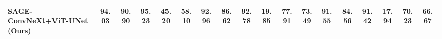 \begin{table}[t]
{\begin{tabular}{l|ccccc|cccccc|cccccc}
\midrule
\textbf{SAGE-ConvNeXt+ViT-UNet (Ours)} 
& \cellcolor{BestColor}\textcolor{BestTextColor}{94.03} & \cellcolor{BestColor}\textcolor{BestTextColor}{90.90} & \cellcolor{BestColor}\textcolor{BestTextColor}{95.23} & \cellcolor{SecondBestColor}\textcolor{SecondBestTextColor}{45.20} & \cellcolor{SecondBestColor}\textcolor{SecondBestTextColor}{58.10} 
& \cellcolor{BestColor}\textcolor{BestTextColor}{92.96} & \cellcolor{BestColor}\textcolor{BestTextColor}{86.62} & \cellcolor{BestColor}\textcolor{BestTextColor}{92.78} & \cellcolor{BestColor}\textcolor{BestTextColor}{19.85} & \cellcolor{BestColor}\textcolor{BestTextColor}{77.91} & \cellcolor{BestColor}\textcolor{BestTextColor}{73.49} 
& \cellcolor{BestColor}\textcolor{BestTextColor}{91.55} & \cellcolor{BestColor}\textcolor{BestTextColor}{84.56} & \cellcolor{BestColor}\textcolor{BestTextColor}{91.42} & \cellcolor{BestColor}\textcolor{BestTextColor}{17.94} & \cellcolor{BestColor}\textcolor{BestTextColor}{70.23} & \cellcolor{BestColor}\textcolor{BestTextColor}{66.67} \\
\bottomrule
\end{tabular}
}%
\setlength{\tabcolsep}{6pt}
\setlength{\arrayrulewidth}{0.4pt}
\end{table}



